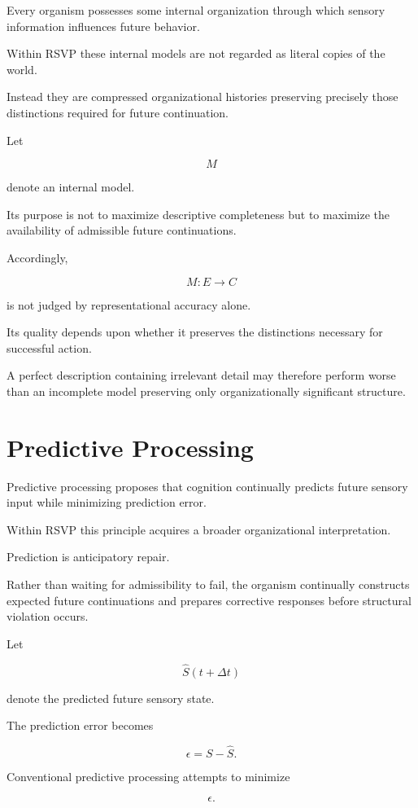 \documentclass[11pt,oneside]{book}
\numberwithin{equation}{chapter}
\theoremstyle{definition}
\theoremstyle{plain}
\begin{document}
Every organism possesses some internal organization through which sensory
information influences future behavior.

Within RSVP these internal models are not regarded as literal copies of the
world.

Instead they are compressed organizational histories preserving precisely
those distinctions required for future continuation.

Let

\[
M
\]

denote an internal model.

Its purpose is not to maximize descriptive completeness but to maximize the
availability of admissible future continuations.

Accordingly,

\[
M : E \rightarrow C
\]

is not judged by representational accuracy alone.

Its quality depends upon whether it preserves the distinctions necessary for
successful action.

A perfect description containing irrelevant detail may therefore perform
worse than an incomplete model preserving only organizationally significant
structure.

\section{Predictive Processing}

Predictive processing proposes that cognition continually predicts future
sensory input while minimizing prediction error.

Within RSVP this principle acquires a broader organizational interpretation.

Prediction is anticipatory repair.

Rather than waiting for admissibility to fail, the organism continually
constructs expected future continuations and prepares corrective responses
before structural violation occurs.

Let

\[
\hat S(t+\Delta t)
\]

denote the predicted future sensory state.

The prediction error becomes

\[
\epsilon = S - \hat S.
\]

Conventional predictive processing attempts to minimize

\[
\epsilon.
\]
\end{document}
